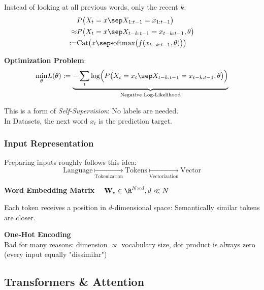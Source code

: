 Instead of looking at all previous words, only the recent $k$:\\
\begin{align*}
            &P\bigl( X_t=x\sep X_{1:t-1} = x_{1:t-1} \bigr)                                     \\
    \approx &P\bigl(X_t=x\sep X_{t-k:t-1} = x_{t-k:t-1}, \theta\bigr)                           \\
    :=      & \text{Cat}\bigl( x \sep \text{softmax}\bigl( f(x_{t-k:t-1}, \theta) \bigr) \bigr)
\end{align*}

\textbf{Optimization Problem}:
$$
    \underset{\theta}{\min} L(\theta) := \underbrace{-\sum_{t}\log\Bigl( P\bigl( X_t=x_t\sep X_{t-k:t-1} = x_{t-k:t-1}, \theta \bigr) \Bigr)}_\text{Negative Log-Likelihood}  
$$

This is a form of \textit{Self-Supervision}: No labels are needed.\\
In Datasets, the next word $x_t$ is the prediction target.\\

\subsubsection{Input Representation}

Preparing inputs roughly follows this idea:
$$
    \text{Language} \underset{\text{Tokenization}}{\mapsto} \text{Tokens} \underset{\text{Vectorization}}{\mapsto} \text{Vector}
$$

 \textbf{Word Embedding Matrix} $\quad \mathbf{W}_e \in \R^{N\times d}, d \ll N$\\ 

Each token receives a position in $d$-dimensional space: Semantically similar tokens are closer.

{\footnotesize
    \remark \textbf{One-Hot Encoding}\\
    Bad for many reasons: dimension $\propto$ vocabulary size, dot product is always zero (every input equally "dissimilar")
}

\newpage
\subsection{Transformers \& Attention}

